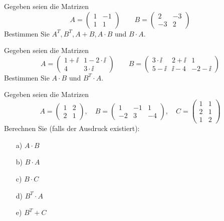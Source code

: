 \begin{aufgabe} Gegeben seien die Matrizen
  	$$ A = \left( \begin{matrix} 1 & -1 \\ 1 & 1 \end{matrix} \right) \qquad 
     	B = \left( \begin{matrix} 2 & -3 \\ -3 & 2 \end{matrix} \right) $$
Bestimmen Sie $A^T, B^T, A + B, A \cdot B$ und $B \cdot A$.
\end{aufgabe}

\begin{aufgabe} Gegeben seien die Matrizen
  	$$ A = \left( \begin{matrix} 1+ \ii & 1-2 \cdot \ii \\ 4 & 3 \cdot \ii \end{matrix} \right) \qquad 
   	B = \left( \begin{matrix} 3 \cdot \ii & 2+ \ii & 1 \\ 5-\ii & \ii - 4 & - 2 -\ii \end{matrix} \right) $$
Bestimmen Sie $A \cdot B$ und $B^T \cdot A$.
\end{aufgabe}

\begin{aufgabe} Gegeben seien die Matrizen
 	$$ A = \left( \begin{matrix} 1 & 2 \\ 2 & 1 \end{matrix} \right), \quad 
   	B = \left( \begin{matrix} 1 & -1 & 1 \\ -2 & 3 & -4 \end{matrix} \right), \quad
     	C = \left( \begin{matrix} 1 & 1 \\ 2 & 1 \\ 1 & 2 \end{matrix} \right) $$
Berechnen Sie (falls der Ausdruck existiert): 
\begin{itemize}
\item[a)] $A \cdot B$
\item[b)] $B \cdot A$
\item[c)] $B \cdot C$
\item[d)] $B^T \cdot A$
\item[e)] $B^T + C$
\end{itemize}
\end{aufgabe} 

\newpage

